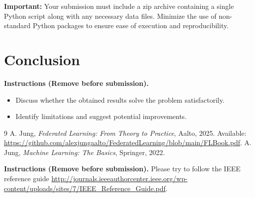 \documentclass[9pt]{article}
\begin{document}
\textbf{Important:} Your submission must include a zip archive containing a single 
Python script along with any necessary data files. Minimize the use of non-standard 
Python packages to ensure ease of execution and reproducibility.

	
	\section{Conclusion}
	\label{sec:conclusion}
	{\bf Instructions (Remove before submission).}
		\begin{itemize}
			\item Discuss whether the obtained results solve the problem satisfactorily.
			\item Identify limitations and suggest potential improvements.
		\end{itemize}
	
	\begin{thebibliography}{9}
		 A. Jung, \textit{Federated Learning: From Theory to Practice}, Aalto, 2025. Available: \url{https://github.com/alexjungaalto/FederatedLearning/blob/main/FLBook.pdf}.
		 A. Jung, \textit{Machine Learning: The Basics}, Springer, 2022.
	\end{thebibliography}
	{\bf Instructions (Remove before submission).} Please try to follow the IEEE reference guide \url{http://journals.ieeeauthorcenter.ieee.org/wp-content/uploads/sites/7/IEEE_Reference_Guide.pdf}.
	
\end{document}
